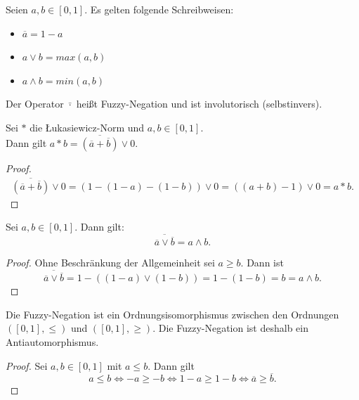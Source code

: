 \documentclass{article}
\begin{document}
\begin{definition}
  Seien $a, b \in [0, 1]$. Es gelten folgende Schreibweisen:
  \begin{itemize}
    \item $\overline{a} = 1 - a$
    \item $a \vee b = max(a, b)$
    \item $a \wedge b = min(a, b)$
  \end{itemize}
  Der Operator $\bar{\cdot}$ heißt Fuzzy-Negation und ist involutorisch (selbstinvers).
\end{definition}

\begin{theorem}
  Sei $\ast$ die Łukasiewicz-Norm und $a, b \in [0, 1]$. \\
  Dann gilt $a \ast b = \overline{(\overline{a} + \overline{b})} \vee 0$.
\end{theorem}
\begin{proof}
  \begin{align*}
    \overline{(\overline{a} + \overline{b})} \vee 0 = (1 - (1 - a) - (1 - b)) \vee 0 = ((a+b) - 1 )\vee 0 = a \ast b.
  \end{align*}
\end{proof}

\begin{theorem}
  Sei $a, b \in [0, 1]$.
  Dann gilt:
  \begin{equation*}
    \overline{\overline{a} \vee \overline{b}} = a \wedge b.
  \end{equation*}
\end{theorem}
\begin{proof}
  Ohne Beschränkung der Allgemeinheit sei $a \geq b$.
  Dann ist 
  \begin{equation*}
    \overline{\overline{a} \vee \overline{b}} = 1 - ((1 - a) \vee (1 - b)) = 1 - (1 - b) = b = a \wedge b.
  \end{equation*}
\end{proof}

\begin{theorem}
  Die Fuzzy-Negation ist ein Ordnungsisomorphismus zwischen den Ordnungen $([0, 1], \leq)$ und $([0, 1], \geq)$.
  Die Fuzzy-Negation ist deshalb ein Antiautomorphismus.
\end{theorem}
\begin{proof}
  Sei $a, b \in [0, 1]$ mit $a \leq b$.
  Dann gilt
  \begin{equation*}
    a \leq b \iff -a \geq -b \iff 1 - a \geq 1 - b \iff \overline{a} \geq \overline{b}.
  \end{equation*}
\end{proof}
\end{document}
